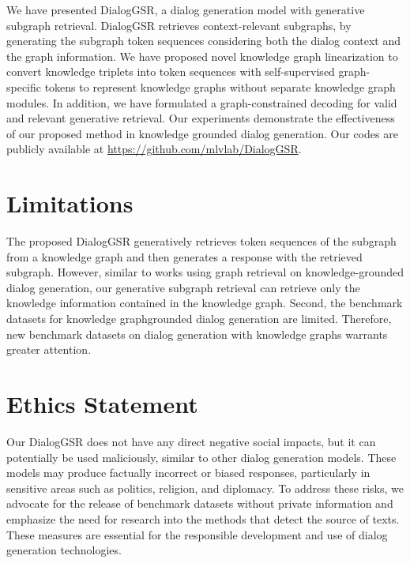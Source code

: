 We have presented DialogGSR, a dialog generation model with generative subgraph retrieval. 
DialogGSR retrieves context-relevant subgraphs, by generating the subgraph token sequences considering both the dialog context and the graph information.
We have proposed novel knowledge graph linearization to convert knowledge triplets into token sequences with self-supervised graph-specific tokens to represent knowledge graphs without separate knowledge graph modules.
In addition, we have formulated a graph-constrained decoding for valid and relevant generative retrieval.
Our experiments demonstrate the effectiveness of our proposed method in knowledge grounded dialog generation.
Our codes are publicly available at \url{https://github.com/mlvlab/DialogGSR}.
\section*{Limitations}
The proposed DialogGSR generatively retrieves token sequences of the subgraph from a knowledge graph and then generates a response with the retrieved subgraph.
However, similar to works using graph retrieval on knowledge-grounded dialog generation, our generative subgraph retrieval can retrieve only the knowledge information contained in the knowledge graph.
Second, the benchmark datasets for knowledge graph{\textendash}grounded dialog generation are limited.
Therefore, new benchmark datasets on dialog generation with knowledge graphs warrants greater attention.


\section*{Ethics Statement}
Our DialogGSR does not have any direct negative social impacts, but it can potentially be used maliciously, similar to other dialog generation models. These models may produce factually incorrect or biased responses, particularly in sensitive areas such as politics, religion, and diplomacy. To address these risks, we advocate for the release of benchmark datasets without private information and emphasize the need for research into the methods that detect the source of texts. These measures are essential for the responsible development and use of dialog generation technologies.
